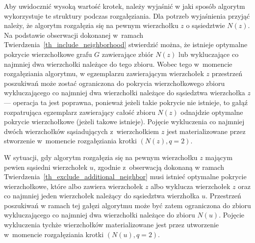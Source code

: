 \par{
  Aby uwidocznić wysoką wartość krotek, należy wyjaśnić w jaki sposób algorytm wykorzystuje te struktury podczas rozgałęziania.
  Dla potrzeb wyjaśnienia przyjąć należy, że algorytm rozgałęzia się na pewnym wierzchołku $z$ o sąsiedztwie $N(z)$.
  Na podstawie obserwacji dokonanej w~ramach Twierdzenia~\ref{th_include_neighborhood} stwierdzić można, że istnieje optymalne pokrycie wierzchołkowe grafu $G$ zawierające zbiór $N(z)$ lub wykluczające co najmniej dwa wierzchołki należące do tego zbioru.
  Wobec tego w~momencie rozgałęziania algorytmu, w egzemplarzu zawierającym wierzchołek $z$ przestrzeń poszukiwań może zostać ograniczona do pokrycia wierzchołkowego zbioru wykluczającego co najmniej dwa wierzchołki należące do sąsiedztwa wierzchołka $z$ --- operacja ta jest poprawna, ponieważ jeżeli takie pokrycie nie istnieje, to gałąź rozpatrująca egzemplarz zawierający całość zbioru $N(z)$ odnajdzie optymalne pokrycie wierzchołkowe (jeżeli takowe istnieje).
  Pojęcie wykluczenia co najmniej dwóch wierzchołków sąsiadujących z~wierzchołkiem $z$ jest materializowane przez stworzenie w~momencie rozgałęziania krotki $(N(z), q=2)$.

  W sytuacji, gdy algorytm rozgałęzia się na pewnym wierzchołku $z$ mającym pewien sąsiedni wierzchołek $u$, zgodnie z~obserwacją dokonaną w ramach Twierdzenia~\ref{th_exclude_additional_neighbor} musi istnieć optymalne pokrycie wierzchołkowe, które albo zawiera wierzchołek $z$ albo wyklucza wierzchołek $z$ oraz co najmniej jeden wierzchołek należący do sąsiedztwa wierzhołka $u$.
  Przestrzeń poszukiwań w ramach tej gałęzi algorytmu może być zatem ograniczona do zbioru wykluczającego co najmniej dwa wierzchołki należące do zbioru $N(u)$.
  Pojęcie wykluczenia tychże wierzchołków materializowane jest przez utworzenie w~momencie rozgałęziania krotki $(N(u), q=2)$.
}
